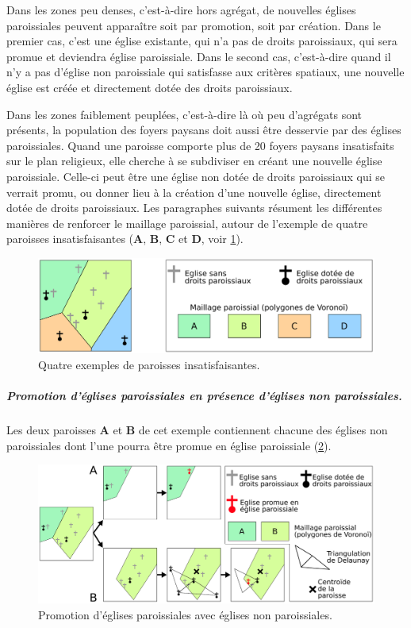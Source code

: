 Dans les zones peu denses, c'est-à-dire hors agrégat, de nouvelles églises paroissiales peuvent apparaître soit par promotion, soit par création.
Dans le premier cas, c'est une église existante, qui n'a pas de droits paroissiaux, qui sera promue et deviendra église paroissiale.
Dans le second cas, c'est-à-dire quand il n'y a pas d'église non paroissiale qui satisfasse aux critères spatiaux, une nouvelle église est créée et directement dotée des droits paroissiaux.

Dans les zones faiblement peuplées, c'est-à-dire là où peu d'agrégats sont présents, la population des foyers paysans doit aussi être desservie par des églises paroissiales.
Quand une paroisse comporte plus de 20 foyers paysans insatisfaits sur le plan religieux, elle cherche à se subdiviser en créant une nouvelle église paroissiale.
Celle-ci peut être une église non dotée de droits paroissiaux qui se verrait promu, ou donner lieu à la création d'une nouvelle église, directement dotée de droits paroissiaux.
Les paragraphes suivants résument les différentes manières de renforcer le maillage paroissial, autour de l'exemple de quatre paroisses \og insatisfaisantes\fg{} (\textbf{A}, \textbf{B}, \textbf{C} et \textbf{D}, voir \cref{fig:promotion-paroisses-base}).

\begin{figure}[H]
	\centering
	\includegraphics[width=1\linewidth]{img/promo_creation_paroisses_base.pdf}
	\caption{Quatre exemples de paroisses insatisfaisantes.}
	\label{fig:promotion-paroisses-base}
\end{figure}


\subparagraph{Promotion d'églises paroissiales en présence d'églises non paroissiales.}
Les deux paroisses \textbf{A} et \textbf{B} de cet exemple contiennent chacune des églises non paroissiales dont l'une pourra être promue en église paroissiale (\cref{fig:promotion-paroisses-1}).

\begin{figure}[H]
	\centering
	\includegraphics[width=1\linewidth]{img/promo_creation_paroisses_promo1.pdf}
	\caption{Promotion d'églises paroissiales avec églises non paroissiales.}
	\label{fig:promotion-paroisses-1}
\end{figure}

